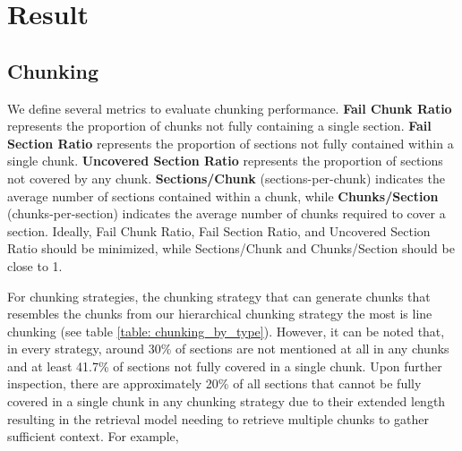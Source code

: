 \section{Result}
\subsection{Chunking}
\label{subsec: chunking}

We define several metrics to evaluate chunking performance. \textbf{Fail Chunk Ratio} represents the proportion of chunks not fully containing a single section. \textbf{Fail Section Ratio} represents the proportion of sections not fully contained within a single chunk. \textbf{Uncovered Section Ratio} represents the proportion of sections not covered by any chunk. \textbf{Sections/Chunk} (sections-per-chunk) indicates the average number of sections contained within a chunk, while \textbf{Chunks/Section} (chunks-per-section) indicates the average number of chunks required to cover a section. Ideally, Fail Chunk Ratio, Fail Section Ratio, and Uncovered Section Ratio should be minimized, while Sections/Chunk and Chunks/Section should be close to 1.


For chunking strategies, the chunking strategy that can generate chunks that resembles the chunks from our hierarchical chunking strategy the most is line chunking (see table \ref{table: chunking_by_type}). However, it can be noted that, in every strategy, around 30\% of sections are not mentioned at all in any chunks and at least 41.7\% of sections not fully covered in a single chunk. Upon further inspection, there are approximately 20\% of all sections that cannot be fully covered in a single chunk in any chunking strategy due to their extended length resulting in the retrieval model needing to retrieve multiple chunks to gather sufficient context. For example,

